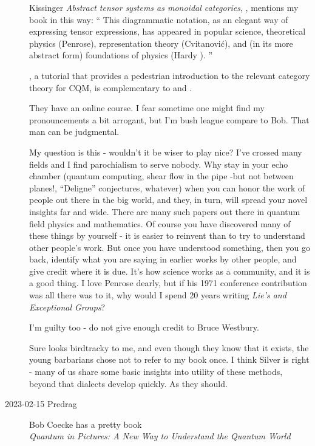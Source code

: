 \begin{description}
Kissinger
{\em Abstract tensor systems as monoidal categories},
, mentions my book in this way: ``
This diagrammatic notation, as an elegant way of expressing tensor expressions,
has appeared in popular science, theoretical physics (Penrose), representation
theory (Cvitanovi{\'c}), and (in its more abstract form) foundations of
physics (Hardy ).
''

, a tutorial that provides a pedestrian introduction to the
relevant category theory for CQM, is complementary to  and
.

They have an  {online
course}. I fear sometime one might find
 {my
pronouncements} a bit arrogant, but I'm bush league compare to Bob. That man
can be judgmental.

My question is this - wouldn't it be wiser to play nice? I've crossed many
fields and I find parochialism to serve nobody. Why stay in your echo chamber
(quantum computing, shear flow in the pipe -but not between planes!,
``Deligne'' conjectures, whatever) when you can honor the work of people out
there in the big world, and they, in turn, will spread your novel insights far
and wide. There are many such papers out there in quantum field physics and
mathematics. Of course you have discovered many of these things by yourself -
it is easier to reinvent than to try to understand other people's work. But
once you have understood something, then you go back, identify what you are
saying in earlier works by other people, and give credit where it is due. It's
how science works as a community, and it is a good thing. I love Penrose dearly,
but if his 1971 conference contribution was all there was to
it, why would I spend 20 years writing {\em Lie's and Exceptional Groups}?

I'm guilty too - do not give enough credit to Bruce Westbury.

Sure looks birdtracky to me, and even though they know that it exists, the
young barbarians chose not to refer to my book once. I think
Silver is right - many of us share some basic insights into
utility of these methods, beyond that dialects develop quickly. As they should.

   \item[2023-02-15 Predrag]
Bob Coecke has a pretty book\\
{\em Quantum in Pictures: A New Way to Understand the Quantum World}


\end{description}

